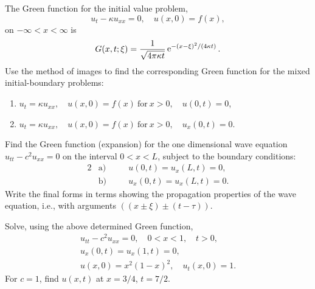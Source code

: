 {%
\begin{Exercise}
  The Green function for the initial value problem,
  \[
  u_t - \kappa u_{x x} = 0, \quad u(x,0) = f(x),
  \]
  on $-\infty < x < \infty$ is
  \[
  G(x,t;\xi) = \frac{1}{\sqrt{4 \pi \kappa t}} \mathop{\mathrm{e}}\nolimits^{-(x-\xi)^2 / (4 \kappa t)}.
  \]
  Use the method of images to find the corresponding Green function for the 
  mixed initial-boundary problems:
  \begin{enumerate}
  \item
    $\displaystyle u_t = \kappa u_{x x}, \quad u(x,0) = f(x)\ \mathrm{for}\
    x > 0, \quad u(0,t) = 0$,
  \item
    $\displaystyle u_t = \kappa u_{x x}, \quad u(x,0) = f(x)\ \mathrm{for}\
    x > 0, \quad u_x(0,t) = 0$.
  \end{enumerate}
\end{Exercise}










\begin{Exercise}
  Find the Green function (expansion) for the one dimensional wave equation
  $u_{t t} - c^2 u_{x x} = 0$ on the interval $0 < x < L$, subject to the
  boundary conditions:
  \begin{alignat*}{2}
    &\mathrm{a)} &\quad &u(0, t) = u_x(L, t) = 0, \\
    &\mathrm{b)} &\quad &u_x(0, t) = u_x(L, t) = 0. 
  \end{alignat*}
  Write the final forms in terms showing the propagation properties of the 
  wave equation, i.e., with arguments $((x \pm \xi) \pm (t - \tau))$.
\end{Exercise}



\begin{Exercise}
  Solve, using the above determined Green function,
  \begin{gather*}
    u_{t t} - c^2 u_{x x} = 0, \quad 0 < x < 1, \quad t > 0, \\
    u_x(0, t) = u_x(1, t) = 0, \\
    u(x, 0) = x^2 (1 - x)^2, \quad u_t(x, 0) = 1.
  \end{gather*}
  For $c = 1$, find $u(x, t)$ at $x = 3/4$, $t = 7/2$.
\end{Exercise}










\raggedbottom
}
